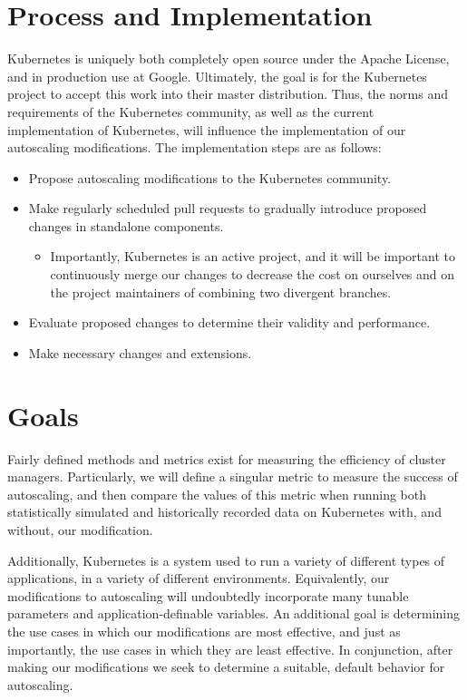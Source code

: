 \documentclass[twoside]{report}
\begin{document}
\section{Process and Implementation}

Kubernetes is uniquely both completely open source under the Apache License, and
in production use at Google.\cite{google-container-engine} Ultimately, the goal
is for the Kubernetes project to accept this work into their master distribution.
Thus, the norms and
requirements of the Kubernetes community, as well as the current implementation
of Kubernetes, will influence the implementation of our autoscaling
modifications. The implementation steps are as follows:

\begin{itemize}
  \item Propose autoscaling modifications to the Kubernetes community.
  \item Make regularly scheduled pull requests to gradually introduce proposed
    changes in standalone components.
    \begin{itemize}
      \item Importantly, Kubernetes is an active project, and it will
        be important to continuously merge our changes to decrease the cost on
        ourselves and on the project maintainers of combining two divergent
        branches.
    \end{itemize}
  \item Evaluate proposed changes to determine their validity and performance.
  \item Make necessary changes and extensions.
\end{itemize}

\section{Goals}

Fairly defined methods and metrics exist for
measuring the efficiency of cluster managers. Particularly, we will define a
singular metric to measure the success of autoscaling, and then compare the
values of this metric when running both statistically simulated and historically
recorded data on Kubernetes with, and without, our modification.

Additionally, Kubernetes is a system used to run a variety of different types of
applications, in a variety of different environments. Equivalently, our
modifications to autoscaling will undoubtedly incorporate many tunable
parameters and application-definable variables. An additional goal is
determining the use cases in which our modifications are most effective, and
just as importantly, the use cases in which they are least effective. In
conjunction, after making our modifications we seek to determine a suitable,
default behavior for autoscaling.
\end{document}
